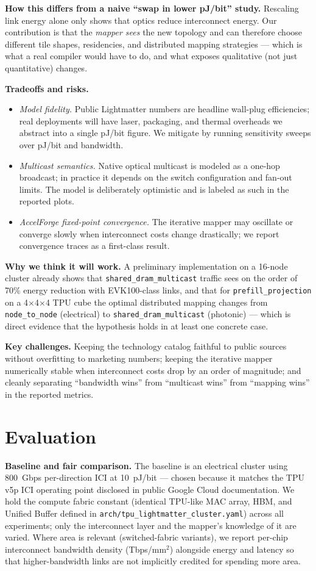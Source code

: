 \documentclass[conference,onecolumn]{IEEEtran}
\begin{document}
\textbf{How this differs from a naive ``swap in lower pJ/bit'' study.}
Rescaling link energy alone only shows that optics reduce interconnect energy.
Our contribution is that the \emph{mapper sees} the new topology and can
therefore choose different tile shapes, residencies, and distributed mapping
strategies --- which is what a real compiler would have to do, and what
exposes qualitative (not just quantitative) changes.

\textbf{Tradeoffs and risks.}
\begin{itemize}
    \item \emph{Model fidelity.} Public Lightmatter numbers are headline
    wall-plug efficiencies; real deployments will have laser, packaging, and
    thermal overheads we abstract into a single pJ/bit figure. We mitigate by
    running sensitivity sweeps over pJ/bit and bandwidth.
    \item \emph{Multicast semantics.} Native optical multicast is modeled as a
    one-hop broadcast; in practice it depends on the switch configuration and
    fan-out limits. The model is deliberately optimistic and is labeled as
    such in the reported plots.
    \item \emph{AccelForge fixed-point convergence.} The iterative mapper may
    oscillate or converge slowly when interconnect costs change drastically;
    we report convergence traces as a first-class result.
\end{itemize}

\textbf{Why we think it will work.}
A preliminary implementation on a 16-node cluster already shows that
\texttt{shared\_dram\_multicast} traffic sees on the order of 70\% energy
reduction with EVK100-class links, and that for \texttt{prefill\_projection} on
a 4$\times$4$\times$4 TPU cube the optimal distributed mapping changes from
\texttt{node\_to\_node} (electrical) to \texttt{shared\_dram\_multicast}
(photonic) --- which is direct evidence that the hypothesis holds in at least
one concrete case.

\textbf{Key challenges.}
Keeping the technology catalog faithful to public sources without overfitting
to marketing numbers; keeping the iterative mapper numerically stable when
interconnect costs drop by an order of magnitude; and cleanly separating
``bandwidth wins'' from ``multicast wins'' from ``mapping wins'' in the
reported metrics.


\section{Evaluation}
\textbf{Baseline and fair comparison.}
The baseline is an electrical cluster using 800~Gbps per-direction ICI at
10~pJ/bit --- chosen because it matches the TPU v5p ICI operating point
disclosed in public Google Cloud documentation. We hold the compute fabric
constant (identical TPU-like MAC array, HBM, and Unified Buffer defined in
\texttt{arch/tpu\_lightmatter\_cluster.yaml}) across all experiments; only the
interconnect layer and the mapper's knowledge of it are varied. Where area is
relevant (switched-fabric variants), we report per-chip interconnect
bandwidth density (Tbps/mm$^2$) alongside energy and latency so that
higher-bandwidth links are not implicitly credited for spending more area.
\end{document}
